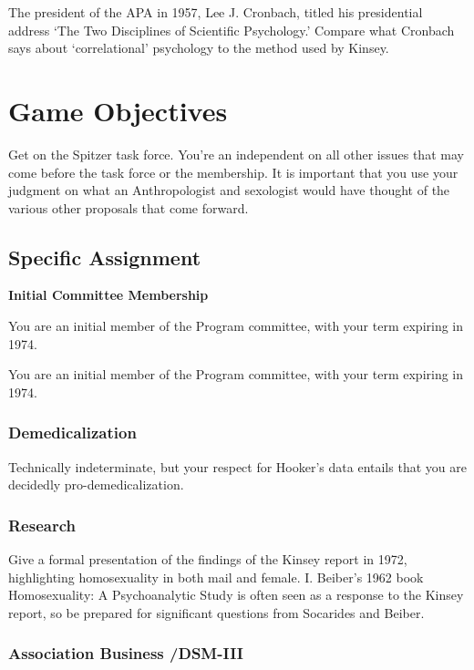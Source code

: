 \begin{refsection}
The president of the APA in 1957, Lee J. Cronbach, titled his presidential address `The Two Disciplines of Scientific Psychology.' Compare what Cronbach says about `correlational' psychology to the method used by Kinsey. 

\section{Game Objectives}
\label{gameobjectives}

Get on the Spitzer task force. You're an independent on all other issues that may come before the task force or the membership. It is important that you use your judgment on what an Anthropologist and sexologist would have thought of the various other proposals that come forward.

\subsection{Specific Assignment}
\label{specificassignment}

\textbf{Initial Committee Membership}
\begin{service}[Gebhard]\label{service:gebhard}
You are an initial member of the Program committee, with your term expiring in 1974.
\end{service}

You are an initial member of the Program committee, with your term expiring in 1974.

\subsubsection{Demedicalization}
\label{demedicalization}

Technically indeterminate, but your respect for Hooker’s data entails that you are decidedly pro-demedicalization.

\subsubsection{Research}
\label{research}

Give a formal presentation of the findings of the Kinsey report in 1972, highlighting homosexuality in both mail and female. I. Beiber's 1962 book Homosexuality: A Psychoanalytic Study is often seen as a response to the Kinsey report, so be prepared for significant questions from Socarides and Beiber.

\subsubsection{Association Business \slash  DSM-III}
\label{associationbusinessdsm-iii}


\end{refsection}
